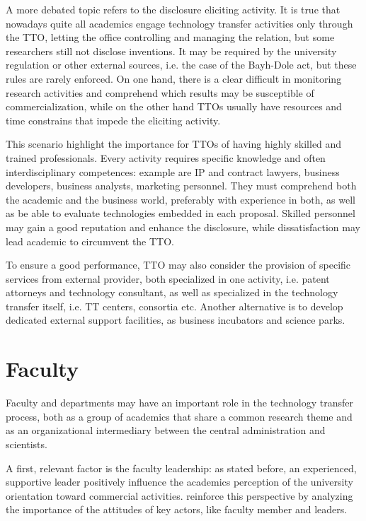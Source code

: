 A more debated topic refers to the disclosure eliciting activity. It is true that nowadays quite all academics engage technology transfer activities only through the TTO, letting the office controlling and managing the relation, but some researchers still not disclose inventions. It may be required by the university regulation or other external sources, i.e. the case of the Bayh-Dole act, but these rules are rarely enforced. On one hand, there is a clear difficult in monitoring research activities and comprehend which results may be susceptible of commercialization, while on the other hand TTOs usually have resources and time constrains that impede the eliciting activity. 

This scenario highlight the importance for TTOs of having highly skilled and trained professionals. Every activity requires specific knowledge and often interdisciplinary competences: example are IP and contract lawyers, business developers, business analysts, marketing personnel. They must comprehend both the academic and the business world, preferably with experience in both, as well as be able to evaluate technologies embedded in each proposal. Skilled personnel may gain a good reputation and enhance the disclosure, while dissatisfaction may lead academic to circumvent the TTO. 

To ensure a good performance, TTO may also consider the provision of specific services from external provider, both specialized in one activity, i.e. patent attorneys and technology consultant, as well as specialized in the technology transfer itself, i.e. TT centers, consortia etc. Another alternative is to develop dedicated external support facilities, as business incubators and science parks.

\section{Faculty}

Faculty and departments may have an important role in the technology transfer process, both as a group of academics that share a common research theme and as an organizational intermediary between the central administration and scientists. 

A first, relevant factor is the faculty leadership: as stated before, an experienced, supportive leader positively influence the academics perception of the university orientation toward commercial activities. \citet{Guerrero2014} reinforce this perspective by analyzing the importance of the attitudes of key actors, like faculty member and leaders. 

